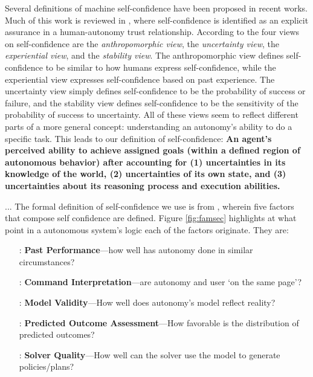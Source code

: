     Several definitions of machine self-confidence have been proposed in recent works. Much of this work is reviewed in \cite{Israelsen2017-ym}, where self-confidence is identified as an explicit assurance in a human-autonomy trust relationship. According to \cite{Sweet2016-tz} the four views on self-confidence are the \textit{anthropomorphic view}, the \textit{uncertainty view}, the \textit{experiential view}, and the \textit{stability view}. The anthropomorphic view defines self-confidence to be similar to how humans express self-confidence, while the experiential view expresses self-confidence based on past experience. The uncertainty view simply defines self-confidence to be the probability of success or failure, and the stability view defines self-confidence to be the sensitivity of the probability of success to uncertainty. All of these views seem to reflect different parts of a more general concept: understanding an autonomy's ability to do a specific task. This leads to our definition of self-confidence: \textbf{An agent's perceived ability to achieve assigned goals (within a defined region of autonomous behavior) after accounting for (1) uncertainties in its knowledge of the world, (2) uncertainties of its own state, and (3) uncertainties about its reasoning process and execution abilities.}

    ... The formal definition of self-confidence we use is from \cite{Aitken2016-cv}, wherein five factors that compose self confidence are defined. Figure \ref{fig:famsec} highlights at what point in a autonomous system's logic each of the factors originate. They are: 

        \begin{itemize}
            \item [\xH{}:] \textbf{Past Performance}---how well has autonomy done in similar circumstances?
            \item [\xI{}:] \textbf{Command Interpretation}---are autonomy and user `on the same page'?
            \item [\xM{}:] \textbf{Model Validity}---How well does autonomy's model reflect reality?
            \item [\xP{}:] \textbf{Predicted Outcome Assessment}---How favorable is the distribution of predicted outcomes?
            \item [\xQ{}:] \textbf{Solver Quality}---How well can the solver use the model to generate policies/plans?
        \end{itemize}

